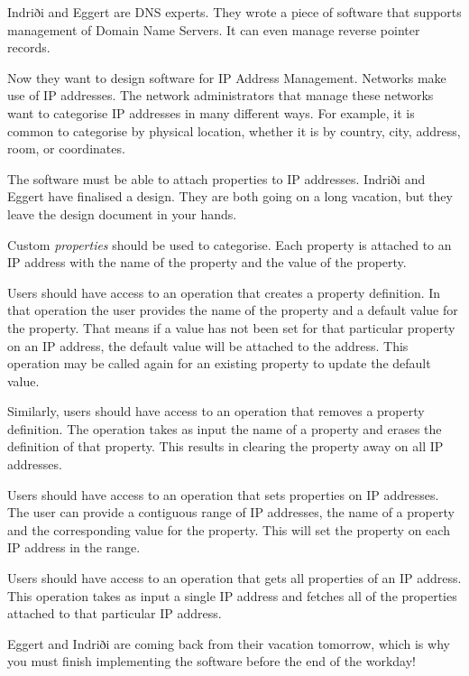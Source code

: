 
Indriði and Eggert are DNS experts.
They wrote a piece of software that supports management of Domain Name Servers.
It can even manage reverse pointer records.

Now they want to design software for IP Address Management.
Networks make use of IP addresses.
The network administrators that manage these networks want to categorise IP addresses in many different ways.
For example, it is common to categorise by physical location, whether it is by country, city, address, room, or coordinates.

The software must be able to attach properties to IP addresses.
Indriði and Eggert have finalised a design.
They are both going on a long vacation, but they leave the design document in your hands.

Custom \emph{properties} should be used to categorise.
Each property is attached to an IP address with the name of the property and the value of the property.

Users should have access to an operation that creates a property definition.
In that operation the user provides the name of the property and a default value for the property.
That means if a value has not been set for that particular property on an IP address, the default value will be attached to the address.
This operation may be called again for an existing property to update the default value.

Similarly, users should have access to an operation that removes a property definition.
The operation takes as input the name of a property and erases the definition of that property.
This results in clearing the property away on all IP addresses.

Users should have access to an operation that sets properties on IP addresses.
The user can provide a contiguous range of IP addresses, the name of a property and the corresponding value for the property.
This will set the property on each IP address in the range.

Users should have access to an operation that gets all properties of an IP address.
This operation takes as input a single IP address and fetches all of the properties attached to that particular IP address.

Eggert and Indriði are coming back from their vacation tomorrow,
which is why you must finish implementing the software before the end of the workday!

